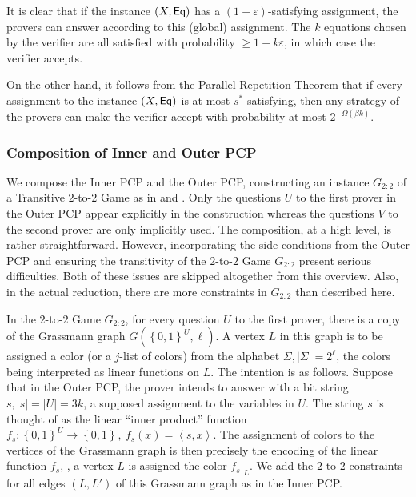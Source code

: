 \documentclass{toc}
\newcommand\set[1]{{\left\{ #1 \right\}}}
\newcommand\power[1]{\set{0,1}^{#1}}
\newcommand\eps{\varepsilon}
\renewcommand\geq{\geqslant}
\begin{document}
\smallskip
{} It is clear that if the instance $(X, {\sf Eq})$ has a $(1-\eps)$-satisfying assignment, the provers can answer according to this
(global) assignment. The $k$ equations chosen by the verifier are all satisfied with probability $\geq 1-k\eps$, in which case the
verifier accepts.

\smallskip
{} On the other hand, it follows from the Parallel Repetition Theorem \cite{Raz98, Holenstein, Rao, DS14} that if
every assignment to the instance $(X, {\sf Eq})$ is at most $s^*$-satisfying, then any strategy of the provers can make the verifier
accept with probability at most $2^{-\Omega(\beta k)}$.

%
\subsubsection{Composition of Inner and Outer PCP}

We compose %
the Inner PCP and the Outer PCP, constructing an instance $G_{2:2}$ of a Transitive $2$-to-$2$ Game as in  and .
Only the questions $U$ to the first prover in the Outer PCP appear explicitly in the construction whereas the questions $V$ to the second prover
are only implicitly used. The composition, at a high level, is rather straightforward. However, incorporating the %
%
side conditions  %
from the Outer PCP
and ensuring the transitivity %
of the $2$-to-$2$ Game $G_{2:2}$
present serious difficulties. Both of these issues are skipped altogether from this overview. Also, in the actual reduction,
there are more constraints in $G_{2:2}$ than described here.

In the $2$-to-$2$ Game $G_{2:2}$,
for every question $U$ to the first prover, there is a copy
 of the Grassmann graph $G(\power{U},\ell)$. A vertex $L$
in this graph is to be assigned a color (or a $j$-list of colors)
from the alphabet $\Sigma, |\Sigma|=2^\ell$, the colors being interpreted as linear functions on $L$. The intention is as follows. Suppose that
in the Outer PCP, the prover intends to answer with a bit string $s, |s| =|U|=3k$, a supposed assignment to the variables in $U$. The string $s$ is
thought of as the linear ``inner product'' function $f_s: \power{U} \to \power{}, ~f_s(x) = \left< s, x\right>$. The assignment of colors to the vertices of
the Grassmann graph is then precisely the encoding of the linear function $f_s$, \ie, a vertex $L$ is assigned the color ${f_s}|_L$.
We add the $2$-to-$2$ constraints for all edges $(L, L')$ of this Grassmann graph as in the Inner PCP.
\end{document}
